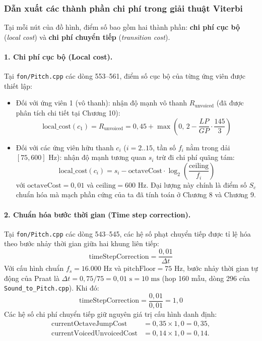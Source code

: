 \subsubsection*{Dẫn xuất các thành phần chi phí trong giải thuật Viterbi}
Tại mỗi nút của đồ hình, điểm số bao gồm hai thành phần: \textbf{chi phí cục bộ} (\emph{local cost}) và \textbf{chi phí chuyển tiếp} (\emph{transition cost}).

\paragraph{1. Chi phí cục bộ (Local cost).}
Tại \texttt{fon/Pitch.cpp} các dòng 553--561, điểm số cục bộ của từng ứng viên được thiết lập:
\begin{itemize}
    \item Đối với ứng viên 1 (vô thanh): nhận độ mạnh vô thanh $R_{\text{unvoiced}}$ (đã được phân tích chi tiết tại Chương 10):
    \begin{equation}
        \text{local\_cost}(c_1) = R_{\text{unvoiced}} = 0{,}45 + \max\left(0,\, 2 - \frac{LP}{GP} \cdot \frac{145}{3}\right)
    \end{equation}
    \item Đối với các ứng viên hữu thanh $c_i$ ($i = 2..15$, tần số $f_i$ nằm trong dải $[75, 600]\text{ Hz}$): nhận độ mạnh tương quan $s_i$ trừ đi chi phí quãng tám:
    \begin{equation}
        \text{local\_cost}(c_i) = s_i - \text{octaveCost} \cdot \log_2\left(\frac{\text{ceiling}}{f_i}\right)
    \end{equation}
    với $\text{octaveCost} = 0{,}01$ và $\text{ceiling} = 600\text{ Hz}$. Đại lượng này chính là điểm số $S_c$ chuẩn hóa mà mạch phần cứng của ta đã tính toán ở Chương 8 và Chương 9.
\end{itemize}

\paragraph{2. Chuẩn hóa bước thời gian (Time step correction).}
Tại \texttt{fon/Pitch.cpp} các dòng 543--545, các hệ số phạt chuyển tiếp được tỉ lệ hóa theo bước nhảy thời gian giữa hai khung liên tiếp:
\begin{equation}
    \text{timeStepCorrection} = \frac{0{,}01}{\Delta t}
\end{equation}
Với cấu hình chuẩn $f_s = 16.000\text{ Hz}$ và $\text{pitchFloor} = 75\text{ Hz}$, bước nhảy thời gian tự động của Praat là $\Delta t = 0{,}75 / 75 = 0{,}01\text{ s} = 10\text{ ms}$ (hop 160 mẫu, dòng 296 của \texttt{Sound\_to\_Pitch.cpp}). Khi đó:
\begin{equation}
    \text{timeStepCorrection} = \frac{0{,}01}{0{,}01} = 1{,}0
\end{equation}
Các hệ số chi phí chuyển tiếp giữ nguyên giá trị cấu hình danh định:
\begin{align}
    \text{currentOctaveJumpCost} &= 0{,}35 \times 1{,}0 = 0{,}35, \\
    \text{currentVoicedUnvoicedCost} &= 0{,}14 \times 1{,}0 = 0{,}14.
\end{align}

